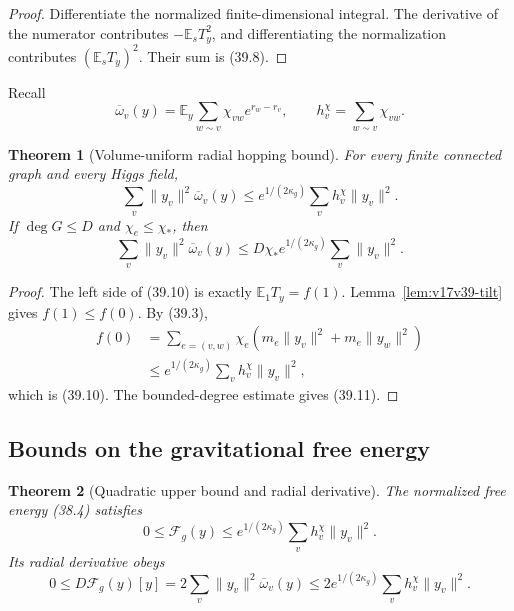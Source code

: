 \documentclass[11pt]{article}
\newtheorem{theorem}{Theorem}[section]
\theoremstyle{remark}
\begin{document}
\begin{proof}
Differentiate the normalized finite-dimensional integral.  The
derivative of the numerator contributes
\(-\mathbb E_sT_y^2\), and differentiating the normalization contributes
\((\mathbb E_sT_y)^2\).  Their sum is (39.8).
\end{proof}

Recall
\[
 \overline\omega_v(y)
 =\mathbb E_y\sum_{w\sim v}\chi_{vw}e^{r_w-r_v},
 \qquad
 h_v^\chi=\sum_{w\sim v}\chi_{vw}.                \tag{39.9}
\]

\begin{theorem}[Volume-uniform radial hopping bound]
\label{thm:v17v39-radial}
For every finite connected graph and every Higgs field,
\[
\boxed{
 \sum_v\|y_v\|^2\overline\omega_v(y)
 \leq e^{1/(2\kappa_g)}
 \sum_vh_v^\chi\|y_v\|^2.}                       \tag{39.10}
\]
If \(\deg G\leq D\) and \(\chi_e\leq\chi_*\), then
\[
 \sum_v\|y_v\|^2\overline\omega_v(y)
 \leq D\chi_*e^{1/(2\kappa_g)}
 \sum_v\|y_v\|^2.                                \tag{39.11}
\]
\end{theorem}

\begin{proof}
The left side of (39.10) is exactly \(\mathbb E_1T_y=f(1)\).
Lemma~\ref{lem:v17v39-tilt} gives \(f(1)\leq f(0)\).  By (39.3),
\[
\begin{aligned}
 f(0)
 &=\sum_{e=(v,w)}\chi_e\left(
 m_e\|y_v\|^2+m_e\|y_w\|^2\right)\\
 &\leq e^{1/(2\kappa_g)}
 \sum_vh_v^\chi\|y_v\|^2,                       \tag{39.12}
\end{aligned}
\]
which is (39.10).  The bounded-degree estimate gives (39.11).
\end{proof}

\subsection{Bounds on the gravitational free energy}

\begin{theorem}[Quadratic upper bound and radial derivative]
\label{thm:v17v39-free}
The normalized free energy (38.4) satisfies
\[
\boxed{
 0\leq\mathcal F_g(y)
 \leq e^{1/(2\kappa_g)}
 \sum_vh_v^\chi\|y_v\|^2.}                       \tag{39.13}
\]
Its radial derivative obeys
\[
 0\leq D\mathcal F_g(y)[y]
 =2\sum_v\|y_v\|^2\overline\omega_v(y)
 \leq2e^{1/(2\kappa_g)}
 \sum_vh_v^\chi\|y_v\|^2.                       \tag{39.14}
\]
\end{theorem}
\end{document}
